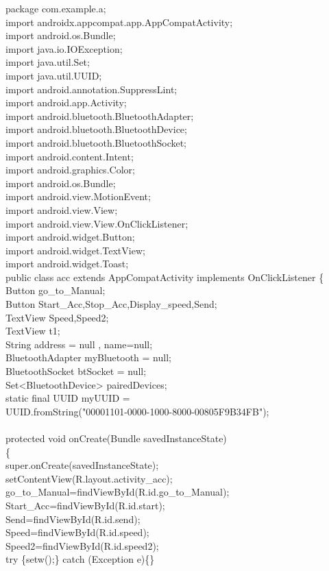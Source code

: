 \documentclass[12pt,a4paper]{report}
\begin{document}
{{{{{{{{{package com.example.a;\\
import androidx.appcompat.app.AppCompatActivity;\\
import android.os.Bundle;\\
import java.io.IOException;\\
import java.util.Set;\\
import java.util.UUID;\\
import android.annotation.SuppressLint;\\
import android.app.Activity;\\
import android.bluetooth.BluetoothAdapter;\\
import android.bluetooth.BluetoothDevice;\\
import android.bluetooth.BluetoothSocket;\\
import android.content.Intent;\\
import android.graphics.Color;\\
import android.os.Bundle;\\
import android.view.MotionEvent;\\
import android.view.View;\\
import android.view.View.OnClickListener;\\
import android.widget.Button;\\
import android.widget.TextView;\\
import android.widget.Toast;\\
public class acc  extends AppCompatActivity  implements OnClickListener \{\\
    Button go\_to\_Manual; \\
    Button Start\_Acc,Stop\_Acc,Display\_speed,Send; \\
    TextView Speed,Speed2;\\
    TextView t1;\\
    String address = null , name=null;\\
    BluetoothAdapter myBluetooth = null;\\
    BluetoothSocket btSocket = null;\\
    Set<BluetoothDevice> pairedDevices;\\
    static final UUID myUUID =    \\ 
    UUID.fromString("00001101-0000-1000-8000-00805F9B34FB");\\
    \@Override\\
    protected void onCreate(Bundle savedInstanceState)\\
    \{\\
        super.onCreate(savedInstanceState);\\
        setContentView(R.layout.activity\_acc);\\
        go\_to\_Manual=findViewById(R.id.go\_to\_Manual);\\
        Start\_Acc=findViewById(R.id.start);\\
        Send=findViewById(R.id.send);\\
        Speed=findViewById(R.id.speed);\\
        Speed2=findViewById(R.id.speed2);\\
        try \{setw();\} catch (Exception e)\{\}\\
       
}}}}}}}}}
\end{document}
